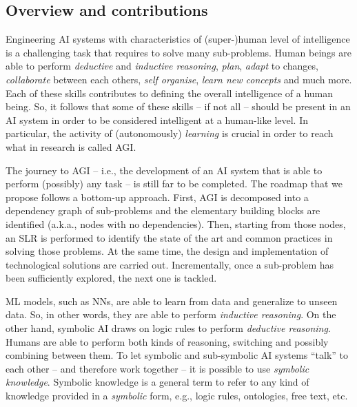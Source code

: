 \begin{refsection}
\section{Overview and contributions}
\label{sec:overview-and-contributions}
%
Engineering \ac{AI} systems with characteristics of (super-)human level of intelligence is a challenging task that requires to solve many sub-problems.
%
Human beings are able to perform \emph{deductive} and \emph{inductive reasoning}, \emph{plan}, \emph{adapt} to changes, \emph{collaborate} between each others, \emph{self organise}, \emph{learn new concepts} and much more.
%
Each of these skills contributes to defining the overall intelligence of a human being.
%
So, it follows that some of these skills -- if not all -- should be present in an \ac{AI} system in order to be considered intelligent at a human-like level.
%
In particular, the activity of (autonomously) \emph{learning} is crucial in order to reach what in research is called \ac{AGI}.


The journey to \ac{AGI} -- i.e., the development of an \ac{AI} system that is able to perform (possibly) any task -- is still far to be completed.
%
The roadmap that we propose follows a bottom-up approach.
%
%
First, \ac{AGI} is decomposed into a dependency graph of sub-problems and the elementary building blocks are identified (a.k.a., nodes with no dependencies).
%
Then, starting from those nodes, an \ac{SLR} is performed to identify the state of the art and common practices in solving those problems.
%
At the same time, the design and implementation of technological solutions are carried out.
%
Incrementally, once a sub-problem has been sufficiently explored, the next one is tackled.


\Ac{ML} models, such as \acp{NN}, are able to learn from data and generalize to unseen data.
%
So, in other words, they are able to perform \emph{inductive reasoning}.
%
On the other hand, symbolic \ac{AI} draws on logic rules to perform \emph{deductive reasoning}.
%
Humans are able to perform both kinds of reasoning, switching and possibly combining between them.
%
To let symbolic and sub-symbolic \ac{AI} systems ``talk'' to each other -- and therefore work together -- it is possible to use \emph{symbolic knowledge}.
%
Symbolic knowledge is a general term to refer to any kind of knowledge provided in a \emph{symbolic} form, e.g., logic rules, ontologies, free text, etc.



\end{refsection}
